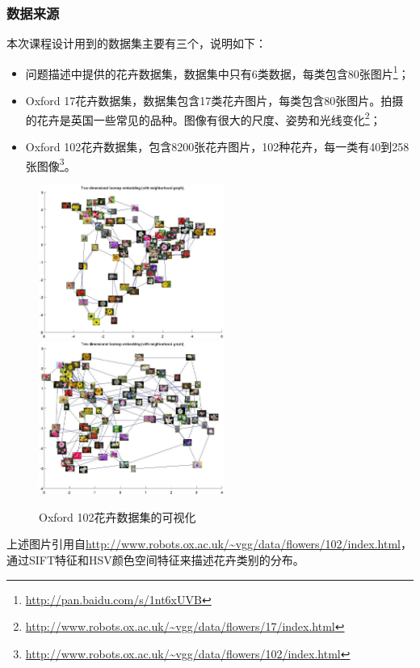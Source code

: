 \documentclass[supercite]{HustGraduPaper}
\begin{document}
\begin{sloppypar}
  \subsubsection{数据来源}
  本次课程设计用到的数据集主要有三个，说明如下：\begin{itemize}
  \item  问题描述中提供的花卉数据集，数据集中只有6类数据，每类包含80张图片\footnote{\url{http://pan.baidu.com/s/1nt6xUVB}}；
  \item  Oxford 17花卉数据集，数据集包含17类花卉图片，每类包含80张图片。拍摄的花卉是英国一些常见的品种。图像有很大的尺度、姿势和光线变化\footnote{\url{http://www.robots.ox.ac.uk/~vgg/data/flowers/17/index.html}}；
  \item  Oxford 102花卉数据集，包含8200张花卉图片，102种花卉，每一类有40到258张图像\footnote{\url{http://www.robots.ox.ac.uk/~vgg/data/flowers/102/index.html}}。
  \end{itemize}
  \begin{figure}[H]
  \setlength{\abovecaptionskip}{0.2cm}
  \setlength{\belowcaptionskip}{-0.2cm}
  \centering%
    {\includegraphics[height=5cm]{1.jpg}}%
  \hspace{2em}%
      {\includegraphics[height=5cm]{2.jpg}}

  \caption{Oxford 102花卉数据集的可视化}
  \end{figure}

  上述图片引用自\url{http://www.robots.ox.ac.uk/~vgg/data/flowers/102/index.html}，通过SIFT特征和HSV颜色空间特征来描述花卉类别的分布。

\end{sloppypar}
\end{document}
